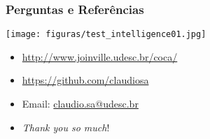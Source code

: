\documentclass{beamer}
\begin{document}
\begin{frame} [allowframebreaks=0.9]
\frametitle{Perguntas e Referências}
  
  \begin{center}
   \texttt{[image: figuras/test\_intelligence01.jpg]} 
  \end{center} 

\vspace{-1cm}

\begin{block}{}
  \begin{itemize}
  \item \url{http://www.joinville.udesc.br/coca/}
  
  \item \url{https://github.com/claudiosa}

  \item Email: \url{claudio.sa@udesc.br}


  \item \textit{Thank you so much}!

  \end{itemize}
  \end{block}

\end{frame}


\end{document}
